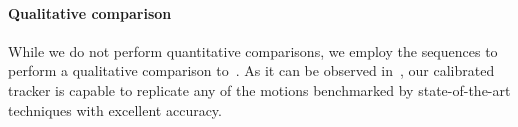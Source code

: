 \paragraph{Qualitative comparison}
While we do not perform quantitative comparisons, we employ the \handy{} sequences to perform a qualitative comparison to~\cite{qian2014realtime,sridhar2015fast,sharp2015accurate,taylor2016concerto}. As it can be observed in~, our calibrated tracker is capable to replicate any of the motions benchmarked by state-of-the-art techniques with excellent accuracy.


